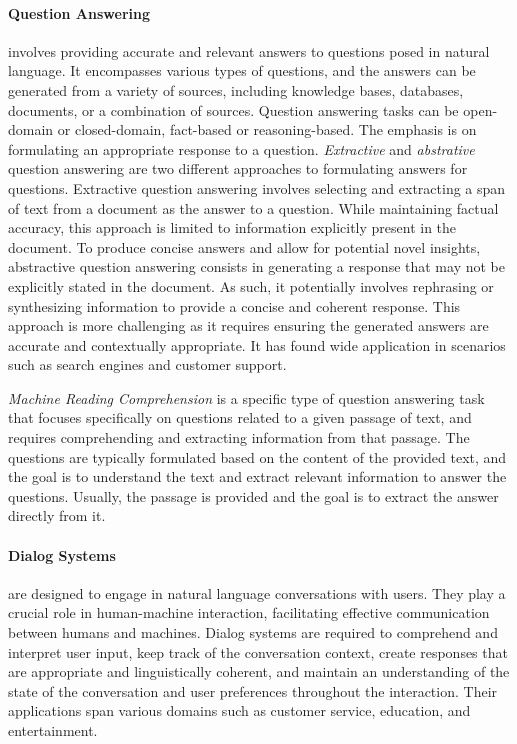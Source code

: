 \paragraph{Question Answering} involves providing accurate and relevant answers to questions posed in natural language. It encompasses various types of questions, and the answers can be generated from a variety of sources, including knowledge bases, databases, documents, or a combination of sources. Question answering tasks can be open-domain or closed-domain, fact-based or reasoning-based. The emphasis is on formulating an appropriate response to a question. \textit{Extractive} and \textit{abstrative} question answering are two different approaches to formulating answers for questions. Extractive question answering involves selecting and extracting a span of text from a document as the answer to a question. While maintaining factual accuracy, this approach is limited to information explicitly present in the document. To produce concise answers and allow for potential novel insights, abstractive question answering consists in generating a response that may not be explicitly stated in the document. As such, it potentially involves rephrasing or synthesizing information to provide a concise and coherent response. This approach is more challenging as it requires ensuring the generated answers are accurate and contextually appropriate. It has found wide application in scenarios such as search engines and customer support.

\textit{Machine Reading Comprehension} is a specific type of question answering task that focuses specifically on questions related to a given passage of text, and requires comprehending and extracting information from that passage. The questions are typically formulated based on the content of the provided text, and the goal is to understand the text and extract relevant information to answer the questions. Usually, the passage is provided and the goal is to extract the answer directly from it.

\paragraph{Dialog Systems} are designed to engage in natural language conversations with users. They play a crucial role in human-machine interaction, facilitating effective communication between humans and machines. Dialog systems are required to comprehend and interpret user input, keep track of the conversation context, create responses that are appropriate and linguistically coherent, and maintain an understanding of the state of the conversation and user preferences throughout the interaction. Their applications span various domains such as customer service, education, and entertainment. \\


